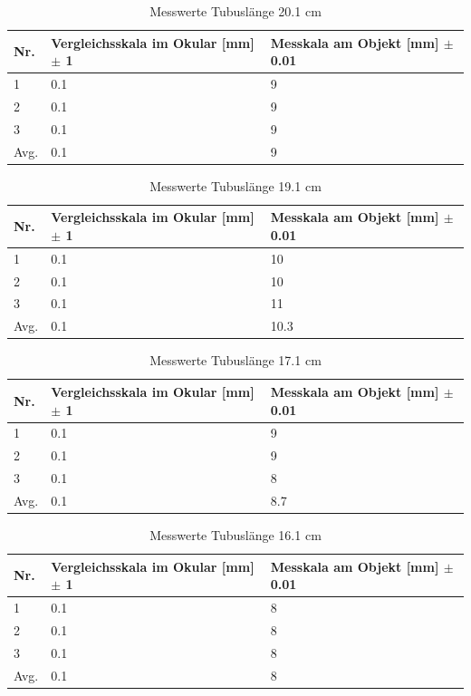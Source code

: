 \documentclass[12pt,a4paper,twoside]{article}
\begin{document}
\begin{table}[H]
    \centering
    \caption{Messwerte Tubuslänge 20.1 cm}
    \label{tab:10XmesswerteTB20}
    \begin{tabular}{| l | l | l |}
        \hline
        Nr.   & Vergleichsskala im Okular [mm] $\pm$ 1 & Messkala am Objekt [mm] $\pm$ 0.01 \\
        \hline
        1 & 0.1 & 9 \\
        2 & 0.1 & 9 \\
        3 & 0.1 & 9 \\
        \hline
        Avg. & 0.1 & 9 \\
        \hline
    \end{tabular}
\end{table}

\begin{table}[H]
    \centering
    \caption{Messwerte Tubuslänge 19.1 cm}
    \label{tab:10XmesswerteTB19}
    \begin{tabular}{| l | l | l |}
        \hline
        Nr.   & Vergleichsskala im Okular [mm] $\pm$ 1 & Messkala am Objekt [mm] $\pm$ 0.01 \\
        \hline
        1 & 0.1 & 10 \\
        2 & 0.1 & 10 \\
        3 & 0.1 & 11 \\
        \hline
        Avg. & 0.1 & 10.3 \\
        \hline
    \end{tabular}
\end{table}

\begin{table}[H]
    \centering
    \caption{Messwerte Tubuslänge 17.1 cm}
    \label{tab:10XmesswerteTB17}
    \begin{tabular}{| l | l | l |}
        \hline
        Nr.   & Vergleichsskala im Okular [mm] $\pm$ 1 & Messkala am Objekt [mm] $\pm$ 0.01 \\
        \hline
        1 & 0.1 & 9 \\
        2 & 0.1 & 9 \\
        3 & 0.1 & 8 \\
        \hline
        Avg. & 0.1 & 8.7 \\
        \hline
    \end{tabular}
\end{table}

\begin{table}[H]
    \centering
    \caption{Messwerte Tubuslänge 16.1 cm}
    \label{tab:10XmesswerteTB16}
    \begin{tabular}{| l | l | l |}
        \hline
        Nr.   & Vergleichsskala im Okular [mm] $\pm$ 1 & Messkala am Objekt [mm] $\pm$ 0.01 \\
        \hline
        1 & 0.1 & 8 \\
        2 & 0.1 & 8 \\
        3 & 0.1 & 8 \\
        \hline
        Avg. & 0.1 & 8 \\
        \hline
    \end{tabular}
\end{table}
\end{document}
